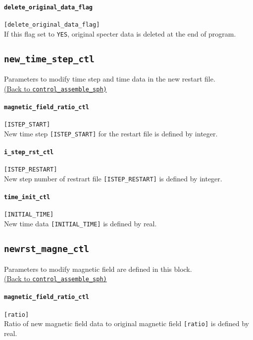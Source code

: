 \paragraph{\tt delete\_original\_data\_flag}
\label{href_t:delete_original_data_flag}
\verb|[delete_original_data_flag]| \\
If this flag set to \verb|YES|, original specter data is deleted at the end of program. 

\subsection{\tt new\_time\_step\_ctl}
\label{href_t:new_time_step_ctl}
Parameters to modify time step and time data in the new restart file. \\
\hyperref[href_i:new_time_step_ctl]{(Back to {\tt control\_assemble\_sph)}}

\paragraph{\tt magnetic\_field\_ratio\_ctl}
\label{href_t:i_step_init_ctl_a} 
\verb|[ISTEP_START]| \\
New time step \verb|[ISTEP_START]| for the restart file is defined by integer.

\paragraph{\tt i\_step\_rst\_ctl}
\label{href_t:i_step_rst_ctl_a} 
\verb|[ISTEP_RESTART]| \\
New step number of restrart file \verb|[ISTEP_RESTART]| is defined by integer.

\paragraph{\tt time\_init\_ctl}
\label{href_t:time_init_ctl_a} 
\verb|[INITIAL_TIME]| \\
New time data \verb|[INITIAL_TIME]| is defined by real.


\subsection{\tt newrst\_magne\_ctl}
\label{href_t:newrst_magne_ctl}
Parameters to modify magnetic field are defined in this block. \\
\hyperref[href_i:newrst_magne_ctl]{(Back to {\tt control\_assemble\_sph)}}

\paragraph{\tt magnetic\_field\_ratio\_ctl}
\label{href_t:magnetic_field_ratio_ctl} 
\verb|[ratio]| \\
Ratio of new magnetic field data to original magnetic field \verb|[ratio]| is defined by real.
